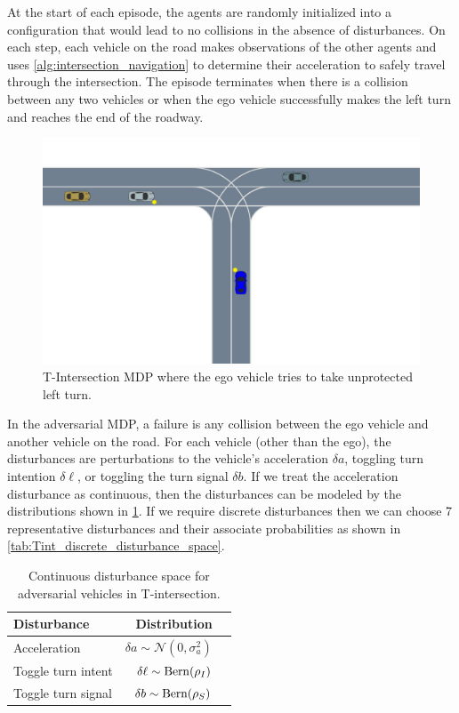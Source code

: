 At the start of each episode, the agents are randomly initialized into a configuration that would lead to no collisions in the absence of disturbances. On each step, each vehicle on the road makes observations of the other agents and uses \cref{alg:intersection_navigation} to determine their acceleration to safely travel through the intersection. The episode terminates when there is a collision between any two vehicles or when the ego vehicle successfully makes the left turn and reaches the end of the roadway. 

\begin{figure}
    \centering
    \includegraphics[trim={0 5cm 0 0},clip, width=\textwidth]{figures/sample_systems/T_intersection.pdf}
    \caption{T-Intersection MDP where the ego vehicle tries to take unprotected left turn. }
    \label{fig:t_intersection}
\end{figure}

In the adversarial MDP, a failure is any collision between the ego vehicle and another vehicle on the road. For each vehicle (other than the ego), the disturbances are perturbations to the vehicle's acceleration $\delta a$, toggling turn intention $\delta \ell$, or toggling the turn signal $\delta b$. If we treat the acceleration disturbance as continuous, then the disturbances can be modeled by the distributions shown in \cref{tab:Tint_continuous_disturbance_space}. If we require discrete disturbances then we can choose \num{7} representative disturbances and their associate probabilities as shown in \cref{tab:Tint_discrete_disturbance_space}.

\begin{table}
    \centering
    \caption{Continuous disturbance space for adversarial vehicles in T-intersection.}
    \label{tab:Tint_continuous_disturbance_space}
    \begin{tabular}{@{}lrr@{}} 
        \toprule
        \textbf{Disturbance} & \textbf{Distribution} \\
        \midrule
        Acceleration &  $\delta a \sim \mathcal{N}(0, \sigma_a^2)$ \\
        Toggle turn intent & $\delta \ell \sim {\rm Bern}(\rho_I)$ \\
        Toggle turn signal & $\delta b \sim {\rm Bern}(\rho_S)$\\
        \bottomrule
    \end{tabular}
\end{table}

